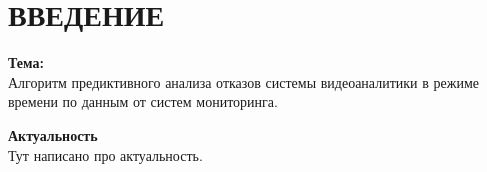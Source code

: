 \newpage
\chapter*{ВВЕДЕНИЕ}  


\textbf{Тема:}\\
\hspace*{1.25cm}Алгоритм предиктивного анализа отказов системы видеоаналитики в режиме времени по данным от систем мониторинга.

\textbf{Актуальность}\\
\hspace*{1.25cm}Тут написано про актуальность.

